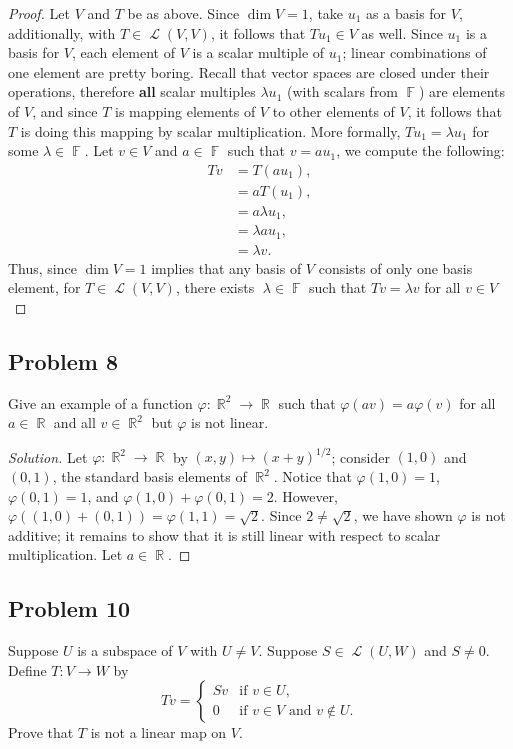 \documentclass[letterpaper, 12pt]{amsart}
\DeclareMathOperator{\R}{\mathbb{R}}
\DeclareMathOperator{\F}{\mathbb{F}}
\DeclareMathOperator{\Ell}{\mathscr{L}}
\theoremstyle{definition}  %
\begin{document}
		\begin{proof}
		Let $V$ and $T$ be as above.
		Since $\dim V = 1$, take $u_{1}$ as a basis for $V$, additionally, with $T \in \Ell(V,V)$, it follows that $Tu_{1} \in V$ as well.
		Since $u_{1}$ is a basis for $V$, each element of $V$ is a scalar multiple of $u_{1}$; linear combinations of one element are pretty boring.
		Recall that vector spaces are closed under their operations, therefore \textbf{all} scalar multiples $\lambda u_{1}$ (with scalars from $\F$) are elements of $V$, and since $T$ is mapping elements of $V$ to other elements of $V$, it follows that $T$ is doing this mapping by scalar multiplication.
		More formally, $Tu_{1} = \lambda u_{1}$ for some $\lambda \in \F$.
		Let $v \in V$ and $a \in \F$ such that $v = a u_{1}$, we compute the following:
			\begin{align*}
				Tv &= T(au_{1}), \\
				&= a T(u_{1}), \\
				&= a \lambda u_{1}, \\
				&= \lambda a u_{1}, \\
				&= \lambda v.
			\end{align*}
		Thus, since $\dim V = 1$ implies that any basis of $V$ consists of only one basis element, for $T \in \Ell(V,V)$, there exists 􏰀$\lambda \in \F$ such that $Tv = \lambda v$ for all $v \in V$
		\end{proof}

		\subsection*{Problem 8}
		Give an example of a function $\varphi : \R^{2} \to \R$ such that $\varphi(av) = a\varphi(v)$ for all $a \in \R$ and all $v \in \R^{2}$ but $\varphi$ is not linear.

		\begin{proof}[Solution]
		Let $\varphi : \R^{2} \to \R$ by $(x,y) \mapsto (x + y)^{1/2}$; consider $(1,0)$ and $(0,1)$, the standard basis elements of $\R^{2}$.
		Notice that $\varphi(1,0) = 1$, \ $\varphi(0,1) = 1$, and $\varphi(1,0) + \varphi(0,1) = 2$.
		However, $\varphi((1,0) + (0,1)) = \varphi(1,1) = \sqrt{2}$.
		Since $2 \neq \sqrt{2}$, we have shown $\varphi$ is not additive; it remains to show that it is still linear with respect to scalar multiplication.
		Let $a \in \R$.
		\end{proof}

		\subsection*{Problem 10}
		Suppose $U$ is a subspace of $V$ with $U \neq V$.
		Suppose $S \in \Ell(U,W)$ and $S \neq 0$.
		Define $T : V \to W$ by $$Tv = \begin{cases} Sv & \text{if $v \in U$}, \\ 0 & \text{if $v \in V$ and $v \notin U$}. \end{cases}$$
		Prove that $T$ is not a linear map on $V$.
\end{document}
